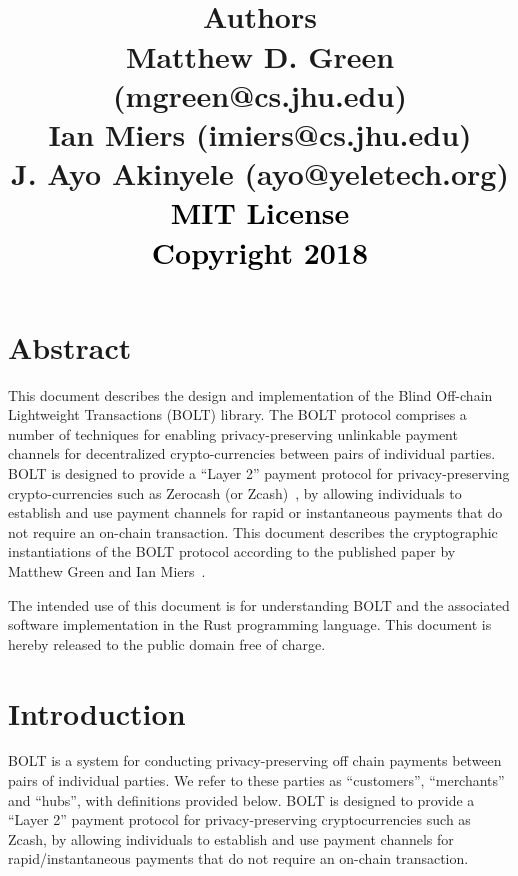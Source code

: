 \documentclass[11pt]{report}
\title{%
\vspace{-1in}
\center
\vspace{1in}
\center
\textcolor{black}{
  {\selectfont{\huge{Blind Off-Chain\\Lightweight Transactions\\(BOLT)}}}}
  \center
  \textcolor{black}{
  {\selectfont{\huge{Version \myversion}}}}
\vspace{1in}
\\
{{\bf Authors}\\ Matthew D. Green (mgreen@cs.jhu.edu) \\ Ian Miers (imiers@cs.jhu.edu)\\J. Ayo Akinyele (ayo@yeletech.org)}
\\
\vspace{2in}
  \textcolor{black}{
  {{\small{MIT License\\Copyright {\textcopyright} 2018}}}}
}
\date{}
\begin{document}
\maketitle
\tableofcontents
\thispagestyle{myfancypage}

\newpage
\chapter*{Abstract}
\label{ch:abstract}
\thispagestyle{myfancypage}

This document describes the design and implementation of the Blind Off-chain Lightweight Transactions (BOLT) library. The BOLT protocol comprises a number of techniques for enabling privacy-preserving unlinkable payment channels for decentralized crypto-currencies between pairs of individual parties. BOLT is designed to provide a ``Layer 2'' payment protocol for privacy-preserving crypto-currencies such as Zerocash (or Zcash)~\cite{Zerocash}, by allowing individuals to establish and use payment channels for rapid or instantaneous payments that do not require an on-chain transaction. This document describes the cryptographic instantiations of the BOLT protocol according to the published paper by Matthew Green and Ian Miers~\cite{BoltCCS}.

The intended use of this document is for understanding BOLT and the associated software implementation in the Rust programming language.  
This document is hereby released to the public domain free of charge.

\thispagestyle{myfancypage}
\chapter{Introduction}
\label{sec:introduction}
\thispagestyle{myfancypage}

BOLT is a system for conducting privacy-preserving off chain payments between pairs of individual parties. We refer to these parties as ``customers'', ``merchants'' and ``hubs'', with definitions provided below. BOLT is designed to provide a ``Layer 2'' payment protocol for privacy-preserving cryptocurrencies such as Zcash, by allowing individuals to establish and use payment channels for rapid/instantaneous payments that do not require an on-chain transaction.
\end{document}
